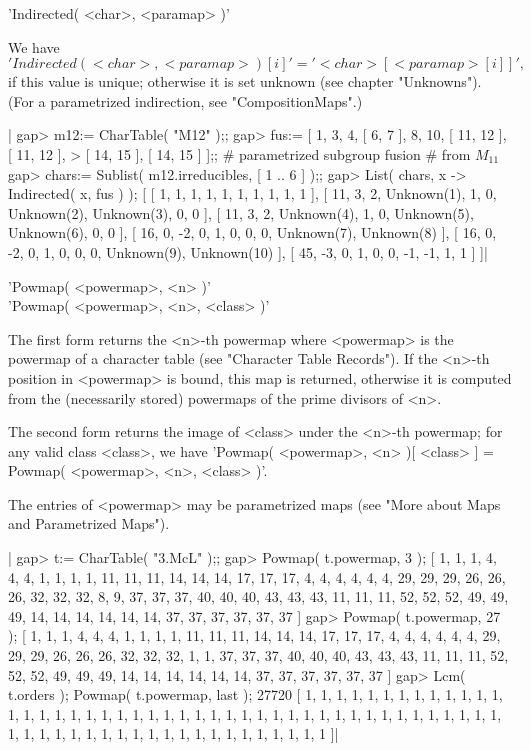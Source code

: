 'Indirected( <char>, <paramap> )'

We have
\[ 'Indirected( <char>, <paramap> )[i]' = '<char>[ <paramap>[i] ]', \]
if this value is unique; otherwise it is set unknown (see chapter "Unknowns").
(For a parametrized indirection, see "CompositionMaps".)

|    gap> m12:= CharTable( "M12" );;
    gap> fus:= [ 1, 3, 4, [ 6, 7 ], 8, 10, [ 11, 12 ], [ 11, 12 ],
    >            [ 14, 15 ], [ 14, 15 ] ];;  # parametrized subgroup fusion
                                             # from $M_{11}$
    gap> chars:= Sublist( m12.irreducibles, [ 1 .. 6 ] );;
    gap> List( chars, x -> Indirected( x, fus ) );
    [ [ 1, 1, 1, 1, 1, 1, 1, 1, 1, 1 ], 
      [ 11, 3, 2, Unknown(1), 1, 0, Unknown(2), Unknown(3), 0, 0 ], 
      [ 11, 3, 2, Unknown(4), 1, 0, Unknown(5), Unknown(6), 0, 0 ], 
      [ 16, 0, -2, 0, 1, 0, 0, 0, Unknown(7), Unknown(8) ], 
      [ 16, 0, -2, 0, 1, 0, 0, 0, Unknown(9), Unknown(10) ], 
      [ 45, -3, 0, 1, 0, 0, -1, -1, 1, 1 ] ]|


'Powmap( <powermap>, <n> )'\\
'Powmap( <powermap>, <n>, <class> )'

The first form returns the <n>-th powermap where <powermap> is the powermap of
a character table (see "Character Table Records").
If the <n>-th position in <powermap> is bound, this map is returned, otherwise
it is computed from the (necessarily stored) powermaps of the prime divisors
of <n>.

The second form returns the image of <class> under the <n>-th powermap;
for any valid class <class>, we have
'Powmap( <powermap>, <n> )[ <class> ] = Powmap( <powermap>, <n>, <class> )'.

The entries of <powermap> may be parametrized maps (see "More about Maps
and Parametrized Maps").

|    gap> t:= CharTable( "3.McL" );;
    gap> Powmap( t.powermap, 3 );
    [ 1, 1, 1, 4, 4, 4, 1, 1, 1, 1, 11, 11, 11, 14, 14, 14, 17, 17, 17,
      4, 4, 4, 4, 4, 4, 29, 29, 29, 26, 26, 26, 32, 32, 32, 8, 9, 37, 37, 
      37, 40, 40, 40, 43, 43, 43, 11, 11, 11, 52, 52, 52, 49, 49, 49, 14, 
      14, 14, 14, 14, 14, 37, 37, 37, 37, 37, 37 ]
    gap> Powmap( t.powermap, 27 );
    [ 1, 1, 1, 4, 4, 4, 1, 1, 1, 1, 11, 11, 11, 14, 14, 14, 17, 17, 17, 
      4, 4, 4, 4, 4, 4, 29, 29, 29, 26, 26, 26, 32, 32, 32, 1, 1, 37, 37, 
      37, 40, 40, 40, 43, 43, 43, 11, 11, 11, 52, 52, 52, 49, 49, 49, 14, 
      14, 14, 14, 14, 14, 37, 37, 37, 37, 37, 37 ]
    gap> Lcm( t.orders ); Powmap( t.powermap, last );
    27720
    [ 1, 1, 1, 1, 1, 1, 1, 1, 1, 1, 1, 1, 1, 1, 1, 1, 1, 1, 1, 1, 1, 1, 
      1, 1, 1, 1, 1, 1, 1, 1, 1, 1, 1, 1, 1, 1, 1, 1, 1, 1, 1, 1, 1, 1, 
      1, 1, 1, 1, 1, 1, 1, 1, 1, 1, 1, 1, 1, 1, 1, 1, 1, 1, 1, 1, 1, 1 ]|

